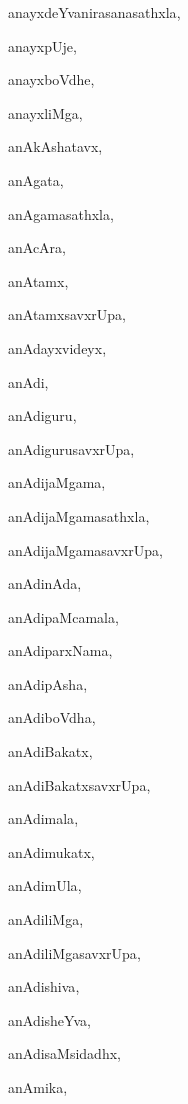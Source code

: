 \begin{multicols}{2}
{anayxdeYvanirasanasathxla}, \pageref{anayxdeYvanirasanasathxla}

{anayxpUje}, \pageref{anayxpUje}

{anayxboVdhe}, \pageref{anayxboVdhe}

{anayxliMga}, \pageref{anayxliMga}

{anAkAshatavx}, \pageref{anAkAshatavx}

{anAgata}, \pageref{anAgata}

{anAgamasathxla}, \pageref{anAgamasathxla}

{anAcAra}, \pageref{anAcAra}

{anAtamx}, \pageref{anAtamx}

{anAtamxsavxrUpa}, \pageref{anAtamxsavxrUpa}

{anAdayxvideyx}, \pageref{anAdayxvideyx}

{anAdi}, \pageref{anAdi}

{anAdiguru}, \pageref{anAdiguru}

{anAdigurusavxrUpa}, \pageref{anAdigurusavxrUpa}

{anAdijaMgama}, \pageref{anAdijaMgama}

{anAdijaMgamasathxla}, \pageref{anAdijaMgamasathxla}

{anAdijaMgamasavxrUpa}, \pageref{anAdijaMgamasavxrUpa}

{anAdinAda}, \pageref{anAdinAda}

{anAdipaMcamala}, \pageref{anAdipaMcamala}

{anAdiparxNama}, \pageref{anAdiparxNama}

{anAdipAsha}, \pageref{anAdipAsha}

{anAdiboVdha}, \pageref{anAdiboVdha}

{anAdiBakatx}, \pageref{anAdiBakatx}

{anAdiBakatxsavxrUpa}, \pageref{anAdiBakatxsavxrUpa}

{anAdimala}, \pageref{anAdimala}

{anAdimukatx}, \pageref{anAdimukatx}

{anAdimUla}, \pageref{anAdimUla}

{anAdiliMga}, \pageref{anAdiliMga}

{anAdiliMgasavxrUpa}, \pageref{anAdiliMgasavxrUpa}

{anAdishiva}, \pageref{anAdishiva}

{anAdisheYva}, \pageref{anAdisheYva}

{anAdisaMsidadhx}, \pageref{anAdisaMsidadhx}

{anAmika}, \pageref{anAmika}


\end{multicols}

